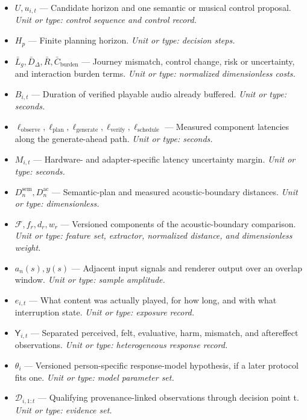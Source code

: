 \begin{itemize}[leftmargin=1.35em,itemsep=0.52em]
  \item ${U, u_{i,t}}$ --- Candidate horizon and one semantic or musical control proposal. \textit{Unit or type: control sequence and control record.}
  \item ${H_p}$ --- Finite planning horizon. \textit{Unit or type: decision steps.}
  \item ${\bar{L}_g,\bar{D}_{\Delta},\bar{R},\bar{C}_{\mathrm{burden}}}$ --- Journey mismatch, control change, risk or uncertainty, and interaction burden terms. \textit{Unit or type: normalized dimensionless costs.}
  \item ${B_{i,t}}$ --- Duration of verified playable audio already buffered. \textit{Unit or type: seconds.}
  \item ${\ell_{\mathrm{observe}},\ell_{\mathrm{plan}},\ell_{\mathrm{generate}},\ell_{\mathrm{verify}},\ell_{\mathrm{schedule}}}$ --- Measured component latencies along the generate-ahead path. \textit{Unit or type: seconds.}
  \item ${M_{i,t}}$ --- Hardware- and adapter-specific latency uncertainty margin. \textit{Unit or type: seconds.}
  \item ${D^{\mathrm{sem}}_n,D^{\mathrm{ac}}_n}$ --- Semantic-plan and measured acoustic-boundary distances. \textit{Unit or type: dimensionless.}
  \item ${\mathcal{F},f_r,d_r,w_r}$ --- Versioned components of the acoustic-boundary comparison. \textit{Unit or type: feature set, extractor, normalized distance, and dimensionless weight.}
  \item ${a_n(s),y(s)}$ --- Adjacent input signals and renderer output over an overlap window. \textit{Unit or type: sample amplitude.}
  \item ${e_{i,t}}$ --- What content was actually played, for how long, and with what interruption state. \textit{Unit or type: exposure record.}
  \item ${\mathsf{Y}_{i,t}}$ --- Separated perceived, felt, evaluative, harm, mismatch, and aftereffect observations. \textit{Unit or type: heterogeneous response record.}
  \item ${\theta_i}$ --- Versioned person-specific response-model hypothesis, if a later protocol fits one. \textit{Unit or type: model parameter set.}
  \item ${\mathcal{D}_{i,1:t}}$ --- Qualifying provenance-linked observations through decision point t. \textit{Unit or type: evidence set.}
\end{itemize}
